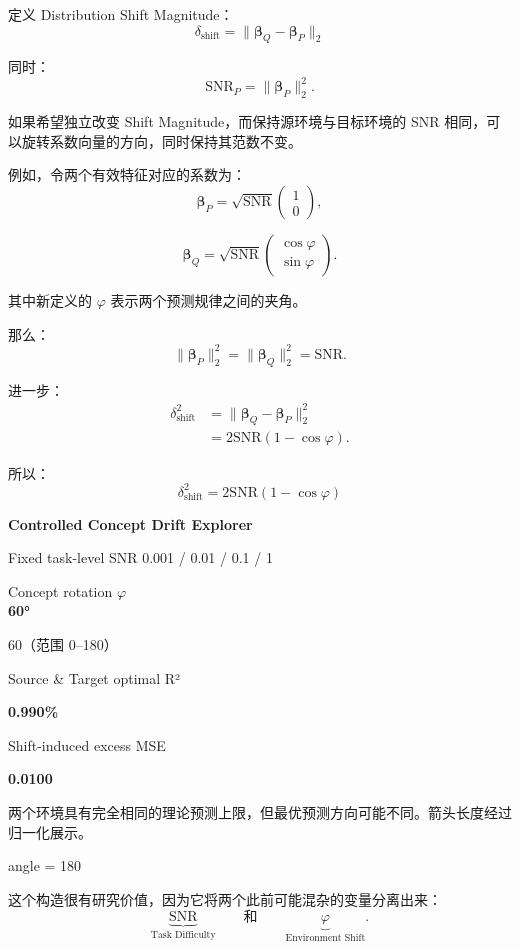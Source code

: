 定义 Distribution Shift Magnitude：
\[\boxed{
\delta_{\mathrm{shift}}
=
\|\boldsymbol\beta_Q-\boldsymbol\beta_P\|_2
}\]

同时：
\[\mathrm{SNR}_P=\|\boldsymbol\beta_P\|_2^2.\]

如果希望独立改变 Shift Magnitude，而保持源环境与目标环境的 SNR 相同，可以旋转系数向量的方向，同时保持其范数不变。

例如，令两个有效特征对应的系数为：
\[\boldsymbol\beta_P=
\sqrt{\mathrm{SNR}}
\begin{pmatrix}1\\0\end{pmatrix},\]

\[\boldsymbol\beta_Q=
\sqrt{\mathrm{SNR}}
\begin{pmatrix}\cos\varphi\\\sin\varphi\end{pmatrix}.\]

其中新定义的 \(\varphi\) 表示两个预测规律之间的夹角。

那么：
\[\|\boldsymbol\beta_P\|_2^2
=
\|\boldsymbol\beta_Q\|_2^2
=
\mathrm{SNR}.\]

进一步：
\[\begin{aligned}
\delta_{\mathrm{shift}}^2
&=
\|\boldsymbol\beta_Q-\boldsymbol\beta_P\|_2^2\\
&=
2\mathrm{SNR}(1-\cos\varphi).
\end{aligned}\]

所以：
\[\boxed{
\delta_{\mathrm{shift}}^2
=
2\mathrm{SNR}(1-\cos\varphi)
}\]

\textbf{Controlled Concept Drift Explorer}

Fixed task-level SNR 0.001 / 0.01 / 0.1 / 1

Concept rotation \(\varphi\)\\
\textbf{60°}

60（范围 0--180）


Source \& Target optimal R²

\textbf{0.990\%}

Shift-induced excess MSE

\textbf{0.0100}

两个环境具有完全相同的理论预测上限，但最优预测方向可能不同。箭头长度经过归一化展示。

angle = 180


这个构造很有研究价值，因为它将两个此前可能混杂的变量分离出来：
\[\underbrace{\mathrm{SNR}}_{\text{Task Difficulty}}
\qquad\text{和}\qquad
\underbrace{\varphi}_{\text{Environment Shift}}.\]

